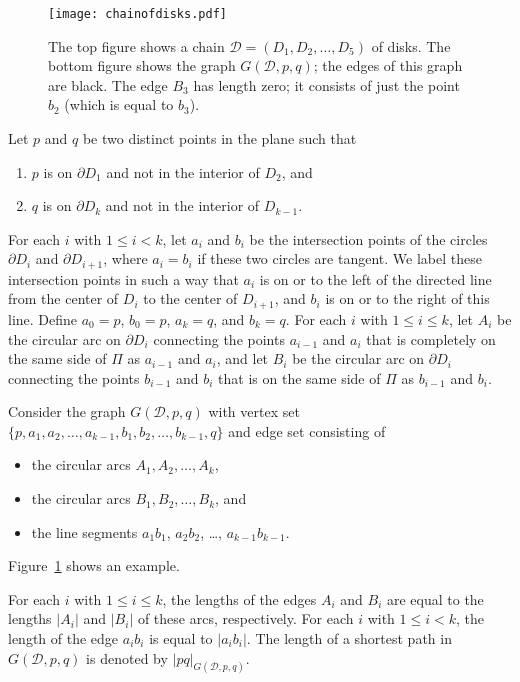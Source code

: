 \documentclass[12pt]{article}
\begin{document}
\begin{figure}
\begin{center}
\texttt{[image: chainofdisks.pdf]}
\end{center}
\caption{The top figure shows a chain 
    $\mathcal{D} = (D_1,D_2,\ldots,D_5)$ of disks. The bottom figure 
    shows the graph $G(\mathcal{D},p,q)$; the edges of this graph are 
    black. The edge $B_3$ has length zero; it consists of just the 
    point $b_2$ (which is equal to $b_3$).}
\label{figCoD}
\end{figure}

Let $p$ and $q$ be two distinct points in the plane such that
\begin{enumerate} 
\item $p$ is on $\partial D_1$ and not in the interior of $D_2$, and  
\item $q$ is on $\partial D_k$ and not in the interior of $D_{k-1}$.  
\end{enumerate} 
For each $i$ with $1 \leq i < k$, let $a_i$ and $b_i$ be the intersection 
points of the circles $\partial D_i$ and $\partial D_{i+1}$, where 
$a_i = b_i$ if these two circles are tangent. We label these intersection 
points in such a way that $a_i$ is on or to the left of the directed 
line from the center of $D_i$ to the center of $D_{i+1}$, and $b_i$ is on 
or to the right of this line. Define $a_0 = p$, $b_0 = p$, $a_k = q$, and 
$b_k = q$. For each $i$ with $1 \leq i \leq k$, let $A_i$ be the circular 
arc on $\partial D_i$ connecting the points $a_{i-1}$ and $a_i$ that 
is completely on the same side of $\Pi$ as $a_{i-1}$ and $a_i$, and 
let $B_i$ be the circular arc on $\partial D_i$ connecting the points 
$b_{i-1}$ and $b_i$ that is on the same side of $\Pi$ as $b_{i-1}$ and 
$b_i$. 

Consider the graph $G(\mathcal{D},p,q)$ with vertex set 
$\{p,a_1,a_2,\ldots,a_{k-1},b_1,b_2,\ldots,b_{k-1},q\}$ and edge set 
consisting of 
\begin{itemize}
\item the circular arcs $A_1,A_2,\ldots,A_k$, 
\item the circular arcs $B_1,B_2,\ldots,B_k$, and 
\item the line segments $a_1 b_1$, $a_2 b_2$, \ldots , $a_{k-1} b_{k-1}$.
\end{itemize} 
Figure~\ref{figCoD} shows an example. 
 
For each $i$ with $1 \leq i \leq k$, the lengths of the edges $A_i$ and 
$B_i$ are equal to the lengths $|A_i|$ and $|B_i|$ of these arcs,
respectively. For each $i$ with $1 \leq i < k$, the length of the edge 
$a_i b_i$ is equal to $|a_i b_i|$. The length of a shortest path in 
$G(\mathcal{D},p,q)$ is denoted by $|pq|_{G(\mathcal{D},p,q)}$. 
\end{document}
